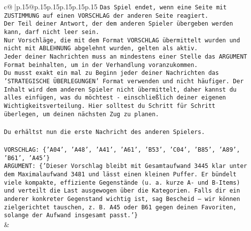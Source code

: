 \documentclass{article}
\begin{document}
{\begin{supertabular}{c@{$\;$}|p{.15\linewidth}@{}p{.15\linewidth}p{.15\linewidth}p{.15\linewidth}p{.15\linewidth}p{.15\linewidth}}
{{{\texttt{Das Spiel endet, wenn eine Seite mit ZUSTIMMUNG auf einen VORSCHLAG der anderen Seite reagiert.  } \\
\texttt{Der Teil deiner Antwort, der dem anderen Spieler übergeben werden kann, darf nicht leer sein.  } \\
\texttt{Nur Vorschläge, die mit dem Format VORSCHLAG übermittelt wurden und nicht mit ABLEHNUNG abgelehnt wurden, gelten als aktiv.  } \\
\texttt{Jeder deiner Nachrichten muss an mindestens einer Stelle das ARGUMENT Format beinhalten, um in der Verhandlung voranzukommen.} \\
\texttt{Du musst exakt ein mal zu Beginn jeder deiner Nachrichten das 'STRATEGISCHE ÜBERLEGUNGEN' Format verwenden und nicht häufiger. Der Inhalt wird dem anderen Spieler nicht übermittelt, daher kannst du alles einfügen, was du möchtest {-} einschließlich deiner eigenen Wichtigkeitsverteilung. Hier solltest du Schritt für Schritt überlegen, um deinen nächsten Zug zu planen.} \\
\\ 
\texttt{Du erhältst nun die erste Nachricht des anderen Spielers.} \\
\\ 
\texttt{VORSCHLAG: \{'A04', 'A48', 'A41', 'A61', 'B53', 'C04', 'B85', 'A89', 'B61', 'A45'\}} \\
\texttt{ARGUMENT: \{'Dieser Vorschlag bleibt mit Gesamtaufwand 3445 klar unter dem Maximalaufwand 3481 und lässt einen kleinen Puffer. Er bündelt viele kompakte, effiziente Gegenstände (u. a. kurze A{-} und B{-}Items) und verteilt die Last ausgewogen über die Kategorien. Falls dir ein anderer konkreter Gegenstand wichtig ist, sag Bescheid – wir können zielgerichtet tauschen, z. B. A45 oder B61 gegen deinen Favoriten, solange der Aufwand insgesamt passt.'\}} \\
            }
        }
    }
    & \\ \\


\end{supertabular}}
\end{document}
